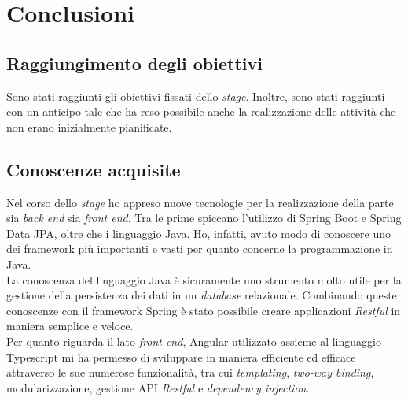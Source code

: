 
\chapter{Conclusioni}
\label{cap:conclusioni}
\section{Raggiungimento degli obiettivi}
Sono stati raggiunti gli obiettivi fissati dello \textit{stage}. Inoltre, sono
stati raggiunti con un anticipo tale che ha reso possibile anche la
realizzazione delle attività che non erano inizialmente pianificate.



\section{Conoscenze acquisite}
Nel corso dello \textit{stage} ho appreso nuove tecnologie per la realizzazione
della parte sia \textit{back end} sia \textit{front end}. Tra le prime spiccano
l'utilizzo di Spring Boot e Spring Data JPA, oltre che i linguaggio Java. Ho,
infatti, avuto modo di conoscere uno  dei \gls{framework}  più importanti e
vasti per quanto concerne la programmazione in Java.\\
La conoscenza del linguaggio Java è sicuramente uno strumento molto utile per
la gestione della persistenza dei dati in un \textit{database} relazionale.
Combinando queste conoscenze con il \gls{framework} Spring è stato possibile
creare applicazioni \textit{Restful} in maniera semplice e veloce.\\
Per quanto riguarda il lato \textit{front end}, Angular utilizzato assieme al
linguaggio Typescript mi ha permesso di sviluppare in maniera efficiente ed
efficace attraverso le sue numerose funzionalità, tra cui \textit{templating},
\textit{two-way binding},
modularizzazione, gestione \gls{API} \textit{Restful} e \textit{dependency
    injection}.

